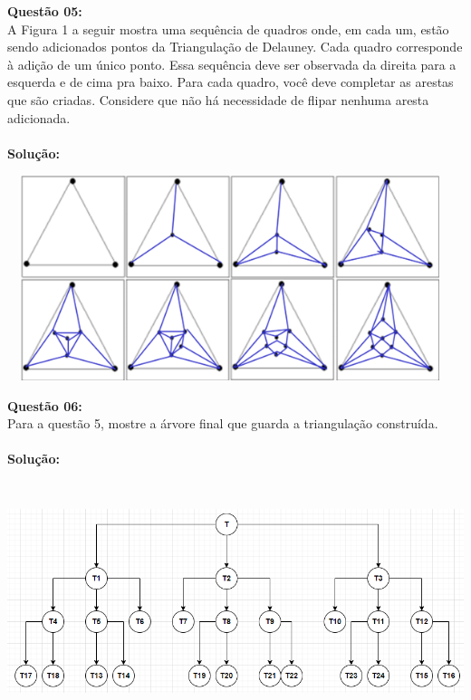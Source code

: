 \noindent\textbf{Questão 05:}\\
A Figura 1 a seguir mostra uma sequência de quadros onde, em cada um, estão
sendo adicionados pontos da Triangulação de Delauney. Cada quadro
corresponde à adição de um único ponto. Essa sequência deve ser observada da
direita para a esquerda e de cima pra baixo. Para cada quadro, você deve
completar as arestas que são criadas. Considere que não há necessidade de flipar
nenhuma aresta adicionada.\\
\\
\noindent\textbf{Solução:}\\
\begin{center}
    \includegraphics[width=13cm,height=6cm]{img_01.png}
\end{center}
\vspace{1cm}

\noindent\textbf{Questão 06:}\\
Para a questão 5, mostre a árvore final que guarda a triangulação construída.\\
\\
\noindent\textbf{Solução:}\\
\begin{center}
    \includegraphics[width=14cm,height=7cm]{img_02.png}
\end{center}
\newpage

